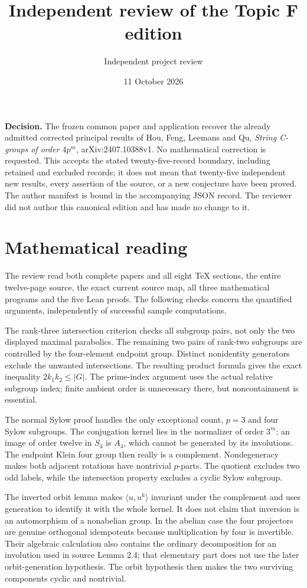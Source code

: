 \documentclass[11pt,a4paper]{article}
\title{Independent review of the Topic F edition}
\author{Independent project review}
\date{11 October 2026}
\begin{document}
\maketitle
\noindent\textbf{Decision.} The frozen common paper and application recover the already admitted corrected principal results of Hou, Feng, Leemans and Qu, \emph{String C-groups of order $4p^m$}, arXiv:2407.10388v1. No mathematical correction is requested. This accepts the stated twenty-five-record boundary, including retained and excluded records; it does not mean that twenty-five independent new results, every assertion of the source, or a new conjecture have been proved. The author manifest is bound in the accompanying JSON record. The reviewer did not author this canonical edition and has made no change to it.

\section*{Mathematical reading}
The review read both complete papers and all eight TeX sections, the entire twelve-page source, the exact current source map, all three mathematical programs and the five Lean proofs. The following checks concern the quantified arguments, independently of successful sample computations.

The rank-three intersection criterion checks all subgroup pairs, not only the two displayed maximal parabolics. The remaining two pairs of rank-two subgroups are controlled by the four-element endpoint group. Distinct nonidentity generators exclude the unwanted intersections. The resulting product formula gives the exact inequality $2k_1k_2\leq |G|$. The prime-index argument uses the actual relative subgroup index; finite ambient order is unnecessary there, but noncontainment is essential.

The normal Sylow proof handles the only exceptional count, $p=3$ and four Sylow subgroups. The conjugation kernel lies in the normalizer of order $3^m$; an image of order twelve in $S_4$ is $A_4$, which cannot be generated by its involutions. The endpoint Klein four group then really is a complement. Nondegeneracy makes both adjacent rotations have nontrivial $p$-parts. The quotient excludes two odd labels, while the intersection property excludes a cyclic Sylow subgroup.

The inverted orbit lemma makes $\langle u,u^k\rangle$ invariant under the complement and uses generation to identify it with the whole kernel. It does not claim that inversion is an automorphism of a nonabelian group. In the abelian case the four projectors are genuine orthogonal idempotents because multiplication by four is invertible. Their algebraic calculation also contains the ordinary decomposition for an involution used in source Lemma 2.4; that elementary part does not use the later orbit-generation hypothesis. The orbit hypothesis then makes the two surviving components cyclic and nontrivial.
\end{document}
